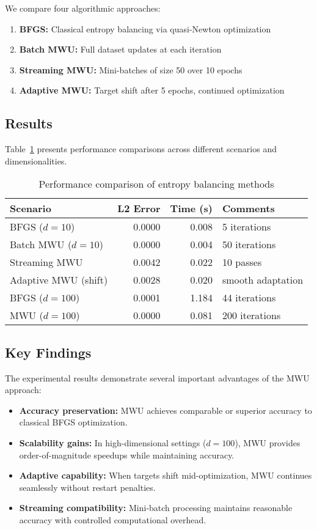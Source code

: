 \documentclass[12pt, letterpaper]{article}
\begin{document}
We compare four algorithmic approaches:
\begin{enumerate}
\item \textbf{BFGS:} Classical entropy balancing via quasi-Newton optimization
\item \textbf{Batch MWU:} Full dataset updates at each iteration
\item \textbf{Streaming MWU:} Mini-batches of size 50 over 10 epochs
\item \textbf{Adaptive MWU:} Target shift after 5 epochs, continued optimization
\end{enumerate}

\subsection{Results}

Table~\ref{tab:results} presents performance comparisons across different scenarios and dimensionalities.

\begin{table}[ht]
\centering
\caption{Performance comparison of entropy balancing methods}
\label{tab:results}
\begin{tabular}{lrrp{4cm}}
\toprule
\textbf{Scenario} & \textbf{L2 Error} & \textbf{Time (s)} & \textbf{Comments} \\
\midrule
BFGS ($d=10$) & 0.0000 & 0.008 & 5 iterations \\
Batch MWU ($d=10$) & 0.0000 & 0.004 & 50 iterations \\
Streaming MWU & 0.0042 & 0.022 & 10 passes \\
Adaptive MWU (shift) & 0.0028 & 0.020 & smooth adaptation \\
BFGS ($d=100$) & 0.0001 & 1.184 & 44 iterations \\
MWU ($d=100$) & 0.0000 & 0.081 & 200 iterations \\
\bottomrule
\end{tabular}
\end{table}

\subsection{Key Findings}

The experimental results demonstrate several important advantages of the MWU approach:

\begin{itemize}
\item \textbf{Accuracy preservation:} MWU achieves comparable or superior accuracy to classical BFGS optimization.
\item \textbf{Scalability gains:} In high-dimensional settings ($d=100$), MWU provides order-of-magnitude speedups while maintaining accuracy.
\item \textbf{Adaptive capability:} When targets shift mid-optimization, MWU continues seamlessly without restart penalties.
\item \textbf{Streaming compatibility:} Mini-batch processing maintains reasonable accuracy with controlled computational overhead.
\end{itemize}
\end{document}
